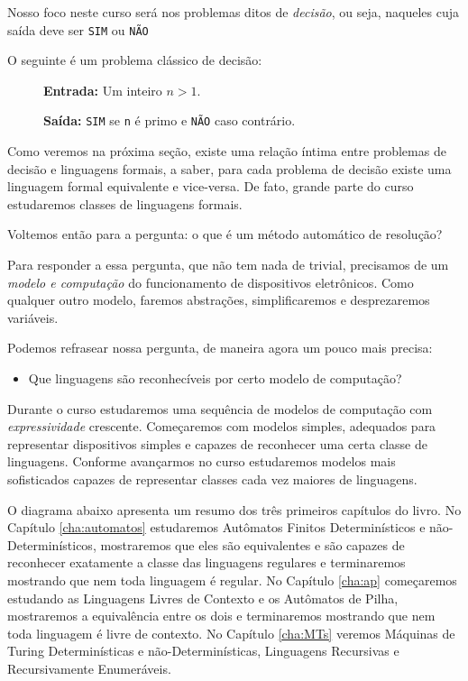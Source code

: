 Nosso foco neste curso será nos problemas ditos de {\em decisão}, ou seja, naqueles cuja saída deve ser {\tt SIM} ou {\tt NÃO}


\begin{example}
  O seguinte é um problema clássico de decisão:
  \begin{description}
  \item[] {\bf Entrada:} Um inteiro $n > 1$.
  \item[] {\bf Saída:} {\tt SIM} se {\tt n} é primo e {\tt NÃO} caso contrário.
  \end{description}
\end{example}

Como veremos na próxima seção, existe uma relação íntima entre problemas de decisão e linguagens formais, a saber, para cada problema de decisão existe uma linguagem formal equivalente e vice-versa.
De fato, grande parte do curso estudaremos classes de linguagens formais.

Voltemos então para a pergunta: o que é um método automático de resolução?

Para responder a essa pergunta, que não tem nada de trivial, precisamos de um {\em modelo e computação} do funcionamento de dispositivos eletrônicos.
Como qualquer outro modelo, faremos abstrações, simplificaremos e desprezaremos variáveis.

Podemos refrasear nossa pergunta, de maneira agora um pouco mais precisa:
\begin{itemize}
\item Que linguagens são reconhecíveis por certo modelo de computação?
\end{itemize}

Durante o curso estudaremos uma sequência de modelos de computação com {\em expressividade} crescente.
Começaremos com modelos simples, adequados para representar dispositivos simples e capazes de reconhecer uma certa classe de linguagens.
Conforme avançarmos no curso estudaremos modelos mais sofisticados capazes de representar classes cada vez maiores de linguagens.

O diagrama abaixo apresenta um resumo dos três primeiros capítulos do livro.
No Capítulo \ref{cha:automatos} estudaremos Autômatos Finitos Determinísticos e não-Determinísticos, mostraremos que eles são equivalentes e são capazes de reconhecer exatamente a classe das linguagens regulares e terminaremos mostrando que nem toda linguagem é regular.
No Capítulo \ref{cha:ap} começaremos estudando as Linguagens Livres de Contexto e os Autômatos de Pilha, mostraremos a equivalência entre os dois e terminaremos mostrando que nem toda linguagem é livre de contexto.
No Capítulo \ref{cha:MTs} veremos Máquinas de Turing Determinísticas e não-Determinísticas, Linguagens Recursivas e Recursivamente Enumeráveis.

